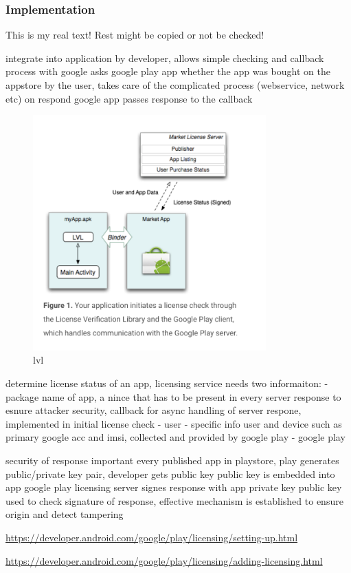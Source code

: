 \subsubsection{Implementation}\label{subsection:license-google-implementation}
This is my real text! Rest might be copied or not be checked!

%
integrate into application by developer, allows simple checking and callback process with google
asks google play app whether the app was bought on the appstore by the user, takes care of the complicated process (webservice, network etc)
on respond google app passes response to the callback
\begin{figure}[h]
    \centering
    \includegraphics[width=0.8\textwidth]{data/lvl.png}
    \caption{lvl}
    \label{fig:lvl}
\end{figure}

determine license status of an app, licensing service needs two informaiton:
- package name of app, a nince that has to be present in every server response to esnure attacker security, callback for async handling of server respone, implemented in initial license check - user
- specific info user and device such as primary google acc and imsi, collected and provided by google play - google play

security of response important
every published app in playstore, play generates public/private key pair, developer gets public key
public key is embedded into app
google play licensing server signes response with app private key
public key used to check signature of response, effective mechanism is established to ensure origin and detect tampering
\cite{munteanLicense}
%

\url{https://developer.android.com/google/play/licensing/setting-up.html}

\url{https://developer.android.com/google/play/licensing/adding-licensing.html}
